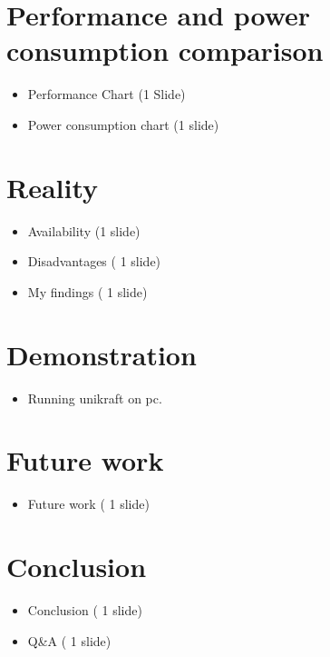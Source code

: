 \documentclass[11pt]{article}       %
\newenvironment{slide}[1]        {\section{#1} \begin{itemize}}%
                                 {\end{itemize}}
\begin{document}
\begin{slide}{Performance and power consumption comparison}
\item Performance Chart (1 Slide)
\item Power consumption chart (1 slide)

\end{slide}


\begin{slide}{Reality}
\item Availability (1 slide)
\item Disadvantages ( 1 slide)
\item My findings ( 1 slide) 
\end{slide}

\begin{slide}{Demonstration}
\item Running unikraft on pc.
\end{slide}

\begin{slide}{Future work}
\item Future work ( 1 slide) 
\end{slide}


\begin{slide}{Conclusion}
\item Conclusion ( 1 slide) 
\item Q\&A ( 1 slide)
\end{slide}






\end{document}
